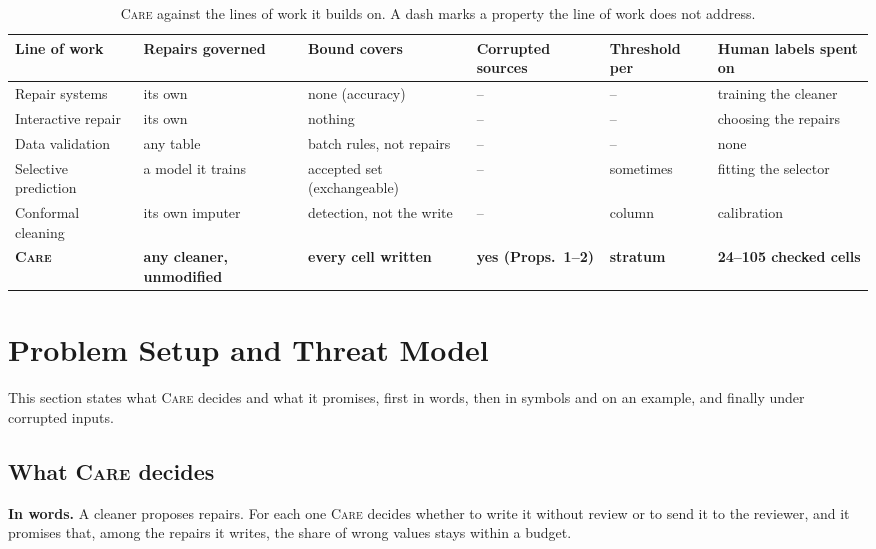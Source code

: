 \documentclass[sigconf, nonacm, balance=false]{acmart}
\theoremstyle{remark}
\begin{document}
\begin{table}[t]
  \centering
  \caption{\textsc{Care} against the lines of work it builds on. A dash marks a property
  the line of work does not address.}
  \label{tab:position}
  \small
  \setlength{\tabcolsep}{3.5pt}
  \renewcommand{\arraystretch}{1.0}
  \begin{tabular}{@{}l l l l l l@{}}
  \toprule
  Line of work & Repairs governed & Bound covers & Corrupted sources & Threshold per & Human labels spent on \\
  \midrule
  Repair systems~\cite{10.14778/3137628.3137631, 10.14778/3407790.3407801, 10.1145/3698811}
    & its own & none (accuracy) & -- & -- & training the cleaner \\
  Interactive repair~\cite{10.14778/1952376.1952378, he2016falcon, 10.1145/3299869.3324956}
    & its own & nothing & -- & -- & choosing the repairs \\
  Data validation~\cite{schelter2018deequ, breck2019tfdv, rabanser2019drift}
    & any table & batch rules, not repairs & -- & -- & none \\
  Selective prediction~\cite{geifman2017selective, mozannar2020defer}
    & a model it trains & accepted set (exchangeable) & -- & sometimes & fitting the selector \\
  Conformal cleaning~\cite{pmlr-v238-jager24a, math14101599}
    & its own imputer & detection, not the write & -- & column & calibration \\
  \midrule
  \textbf{\textsc{Care}} & \textbf{any cleaner, unmodified} & \textbf{every cell written}
    & \textbf{yes (Props.~1--2)} & \textbf{stratum} & \textbf{24--105 checked cells} \\
  \bottomrule
  \end{tabular}
\end{table}

\section{Problem Setup and Threat Model}
\label{sec:setup}

This section states what \textsc{Care} decides and what it promises, first in words,
then in symbols and on an example, and finally under corrupted inputs.

\subsection{What \textsc{Care} decides}
\textbf{In words.} A cleaner proposes repairs. For each one \textsc{Care} decides
whether to write it without review or to send it to the reviewer, and it promises
that, among the repairs it writes, the share of wrong values stays within a budget.
\end{document}
